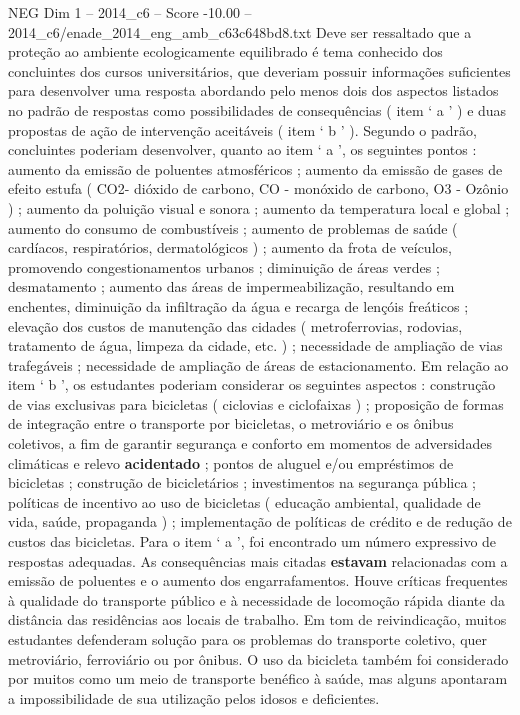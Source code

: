 \begin{textsample}{NEG Dim 1 – 2014\_c6 – Score -10.00 – 2014\_c6/enade\_2014\_eng\_amb\_c63c648bd8.txt}
Deve ser ressaltado que a proteção ao ambiente ecologicamente equilibrado é tema conhecido dos concluintes dos cursos universitários, que deveriam possuir informações suficientes para desenvolver uma resposta abordando pelo menos dois dos aspectos listados no padrão de respostas como possibilidades de consequências ( item ‘ a ’ ) e duas propostas de ação de intervenção aceitáveis ( item ‘ b ’ ).
Segundo o padrão, concluintes poderiam desenvolver, quanto ao item ‘ a ’, os seguintes pontos : aumento da emissão de poluentes atmosféricos ; aumento da emissão de gases de efeito estufa ( CO2- dióxido de carbono, CO - monóxido de carbono, O3 - Ozônio ) ; aumento da poluição visual e sonora ; aumento da temperatura local e global ; aumento do consumo de combustíveis ; aumento de problemas de saúde ( cardíacos, respiratórios, dermatológicos ) ; aumento da frota de veículos, promovendo congestionamentos urbanos ; diminuição de áreas verdes ; desmatamento ; aumento das áreas de impermeabilização, resultando em enchentes, diminuição da infiltração da água e recarga de lençóis freáticos ; elevação dos custos de manutenção das cidades ( metroferrovias, rodovias, tratamento de água, limpeza da cidade, etc. ) ; necessidade de ampliação de vias trafegáveis ; necessidade de ampliação de áreas de estacionamento.
Em relação ao item ‘ b ’, os estudantes poderiam considerar os seguintes aspectos : construção de vias exclusivas para bicicletas ( ciclovias e ciclofaixas ) ; proposição de formas de integração entre o transporte por bicicletas, o metroviário e os ônibus coletivos, a fim de garantir segurança e conforto em momentos de adversidades climáticas e relevo \textbf{acidentado} ; pontos de aluguel e/ou empréstimos de bicicletas ; construção de bicicletários ; investimentos na segurança pública ; políticas de incentivo ao uso de bicicletas ( educação ambiental, qualidade de vida, saúde, propaganda ) ; implementação de políticas de crédito e de redução de custos das bicicletas.
Para o item ‘ a ’, foi encontrado um número expressivo de respostas adequadas.
As consequências mais citadas \textbf{estavam} relacionadas com a emissão de poluentes e o aumento dos engarrafamentos.
Houve críticas frequentes à qualidade do transporte público e à necessidade de locomoção rápida diante da distância das residências aos locais de trabalho.
Em tom de reivindicação, muitos estudantes defenderam solução para os problemas do transporte coletivo, quer metroviário, ferroviário ou por ônibus.
O uso da bicicleta também foi considerado por muitos como um meio de transporte benéfico à saúde, mas alguns apontaram a impossibilidade de sua utilização pelos idosos e deficientes.

\end{textsample}
